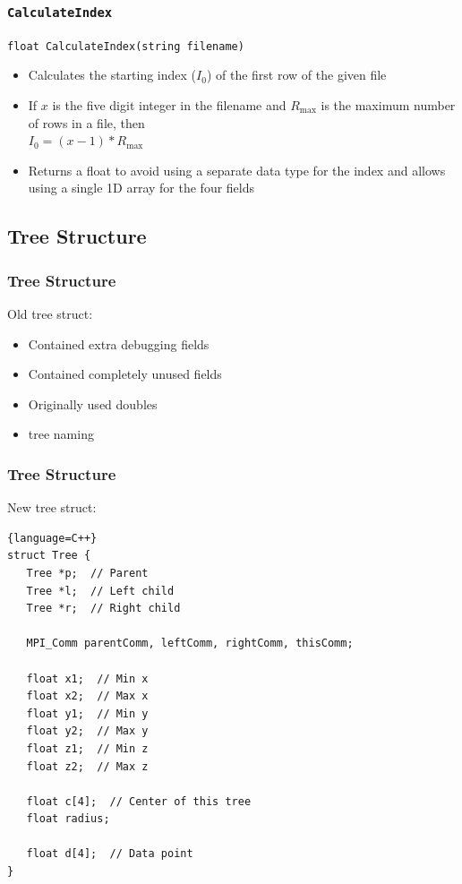 \documentclass[usernames,dvipsnames]{beamer}
\begin{document}

\begin{frame}
	\frametitle{\texttt{CalculateIndex}}
	
    		\texttt{float CalculateIndex(string filename)}
    		    \begin{itemize}
    		        \item Calculates the starting index ($I_0$) of the first row of the given file
    		        \item If $x$ is the five digit integer in the filename and $R_{\max}$ is the maximum number of rows in a file, then \\ 
    		        $I_0 = (x - 1) * R_{\max}$
                    \item Returns a float to avoid using a separate data type for the index and allows using a single 1D array for the four fields
    		    \end{itemize}

\end{frame}

%
%

\subsection{Tree Structure}


\begin{frame}[fragile]
	\frametitle{Tree Structure}
	
    	\begin{block}{Old tree struct:}
    		\begin{itemize}
    			\item Contained extra debugging fields
    			\item Contained completely unused fields
    			\item Originally used doubles
    			\item tree naming
    		\end{itemize}
    	\end{block}
\end{frame}


\begin{frame}[fragile]
	\frametitle{Tree Structure}

\begin{block}{New tree struct:}
\lstset{
   basicstyle=\tiny
}
\begin{lstlisting}{language=C++}
struct Tree {
   Tree *p;  // Parent
   Tree *l;  // Left child
   Tree *r;  // Right child

   MPI_Comm parentComm, leftComm, rightComm, thisComm;

   float x1;  // Min x
   float x2;  // Max x
   float y1;  // Min y
   float y2;  // Max y
   float z1;  // Min z
   float z2;  // Max z

   float c[4];  // Center of this tree
   float radius;

   float d[4];  // Data point
}
\end{lstlisting}
\end{block}
\end{frame}
\end{document}
